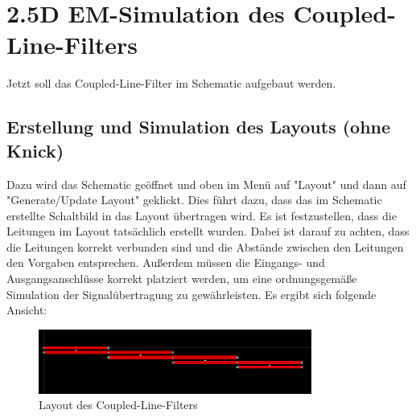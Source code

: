 \section{2.5D EM-Simulation des Coupled-Line-Filters}

Jetzt soll das Coupled-Line-Filter im Schematic aufgebaut werden. 
\subsection{Erstellung und Simulation des Layouts (ohne Knick)}
Dazu wird das Schematic geöffnet und oben im Menü auf "Layout" und dann auf "Generate/Update Layout" geklickt. Dies führt dazu, dass das im Schematic erstellte Schaltbild in das Layout übertragen wird. Es ist festzustellen, dass die Leitungen im Layout tatsächlich erstellt wurden. Dabei ist darauf zu achten, dass die Leitungen korrekt verbunden sind und die Abstände zwischen den Leitungen den Vorgaben entsprechen. Außerdem müssen die Eingangs- und Ausgangsanschlüsse korrekt platziert werden, um eine ordnungsgemäße Simulation der Signalübertragung zu gewährleisten.
Es ergibt sich folgende Ansicht:
\begin{figure}[H]
    \centering
    \includegraphics[width=0.8\textwidth]{Pictures/LayoutohneKnick.png}
    \caption{Layout des Coupled-Line-Filters}
\end{figure}

